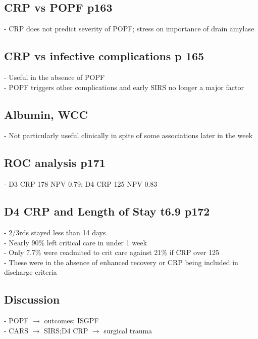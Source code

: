 \documentclass[12pt,a4paper]{article}
\begin{document}
\subsection{CRP vs POPF p163}
- CRP does not predict severity of POPF; stress on importance of drain amylase

\subsection{CRP vs infective complications p 165}
- Useful in the absence of POPF\\
- POPF triggers other complications and early SIRS no longer a major factor

\subsection{Albumin, WCC}
- Not particularly useful clinically in spite of some associations later in the week

\subsection{ROC analysis p171}
- D3 CRP 178 NPV 0.79; D4 CRP 125 NPV 0.83

\subsection{D4 CRP and Length of Stay t6.9 p172}
- 2/3rds stayed less than 14 days\\
- Nearly 90\% left critical care in under 1 week\\
- Only 7.7\% were readmited to crit care against 21\% if CRP over 125\\
- These were in the absence of enhanced recovery or CRP being included in discharge criteria

\subsection{Discussion}
- POPF $\rightarrow$ outcomes; ISGPF\\
- CARS $\rightarrow$ SIRS;D4 CRP $\rightarrow$ surgical trauma 
\end{document}
